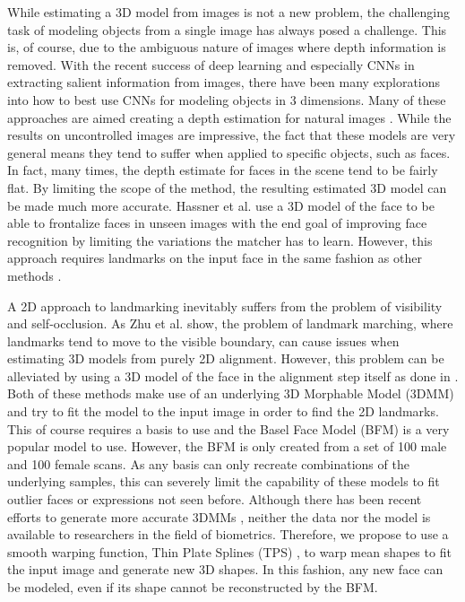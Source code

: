 \documentclass[10pt,twocolumn,letterpaper]{article}
\begin{document}
While estimating a 3D model from images is not a new problem, the challenging task of modeling objects from a single image has always posed a challenge. This is, of course, due to the ambiguous nature of images where depth information is removed. With the recent success of deep learning and especially CNNs in extracting salient information from images, there have been many explorations into how to best use CNNs for modeling objects in 3 dimensions. Many of these approaches are aimed creating a depth estimation for natural images \cite{Liu16dfm, Bansal16marr, Roy16, Liu15dcnn, Li15dcrf}. While the results on uncontrolled images are impressive, the fact that these models are very general means they tend to suffer when applied to specific objects, such as faces. In fact, many times, the depth estimate for faces in the scene tend to be fairly flat. By limiting the scope of the method, the resulting estimated 3D model can be made much more accurate. Hassner et al. \cite{Hassner15eff} use a 3D model of the face to be able to frontalize faces in unseen images with the end goal of improving face recognition by limiting the variations the matcher has to learn. However, this approach requires landmarks on the input face in the same fashion as other methods \cite{jheo_gem_2009,GEM_2011,Hassner15eff,Masi16pafr,Zhu15hfpe}. 

A 2D approach to landmarking inevitably suffers from the problem of visibility and self-occlusion. As Zhu et al. \cite{Zhu15hfpe} show, the problem of landmark marching, where landmarks tend to move to the visible boundary, can cause issues when estimating 3D models from purely 2D alignment. However, this problem can be alleviated by using a 3D model of the face in the alignment step itself as done in \cite{Jourabloo15pifa, Zhu16falp}. Both of these methods make use of an underlying 3D Morphable Model (3DMM) and try to fit the model to the input image in order to find the 2D landmarks. This of course requires a basis to use and the Basel Face Model (BFM) \cite{bfm09} is a very popular model to use. However, the BFM is only created from a set of 100 male and 100 female scans. As any basis can only recreate combinations of the underlying samples, this can severely limit the capability of these models to fit outlier faces or expressions not seen before. Although there has been recent efforts to generate more accurate 3DMMs \cite{3dmm10k}, neither the data nor the model is available to researchers in the field of biometrics. Therefore, we propose to use a smooth warping function, Thin Plate Splines (TPS) \cite{Bookstein89}, to warp mean shapes to fit the input image and generate new 3D shapes. In this fashion, any new face can be modeled, even if its shape cannot be reconstructed by the BFM.
\end{document}
